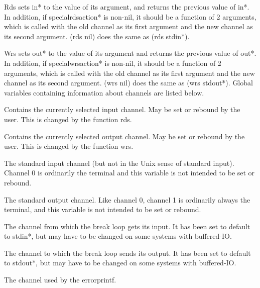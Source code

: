 {    Rds sets in* to the value of its argument, and  returns  the
    previous value of in*.  In addition, if specialrdsaction* is
    non-nil,  it  should  be a function of 2 arguments, which is
    called with the old channel as its first  argument  and  the
    new channel as its second argument.  (rds nil) does the same
    as (rds stdin*).
}

{    Wrs  sets  out* to the value of its argument and returns the
    previous value of out*.  In addition,  if  specialwrsaction*
    is non-nil, it should be a function of 2 arguments, which is
    called  with  the  old channel as its first argument and the
    new channel as its second argument.  (wrs nil) does the same
    as (wrs stdout*).
}
  Global variables containing  information  about  channels  are
listed below.

{
    Contains  the  currently selected input channel.  May be set
    or rebound by the user.  This is  changed  by  the  function
    rds.
}

{
    Contains  the currently selected output channel.  May be set
    or rebound by the user.  This is  changed  by  the  function
    wrs.
}

{
    The  standard  input  channel  (but not in the Unix sense of
    standard input).  Channel 0 is ordinarily the  terminal  and
    this variable is not intended to be set or rebound.
}

{
    The  standard  output channel.  Like channel 0, channel 1 is
    ordinarily always the terminal, and  this  variable  is  not
    intended to be set or rebound.
}

{
    The  channel  from  which the break loop gets its input.  It
    has been set to default  to  stdin*,  but  may  have  to  be
    changed on some systems with buffered-IO.
}

{
    The  channel  to  which the break loop sends its output.  It
    has been set to default to  stdout*,  but  may  have  to  be
    changed on some systems with buffered-IO.
}

{
    The channel used by the errorprintf.
}

